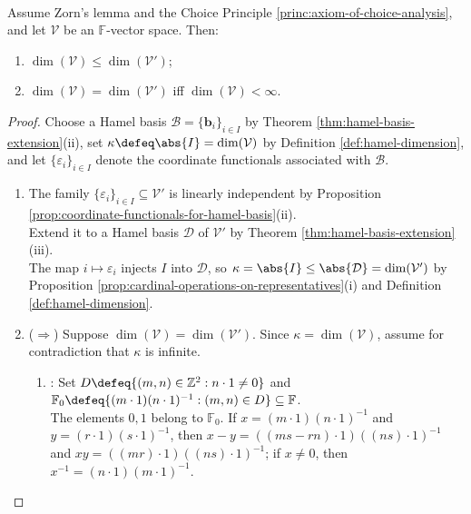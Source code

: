 \begin{theorem} \label{thm:dimension-of-algebraic-dual} \\
Assume Zorn's lemma and the Choice Principle \ref{princ:axiom-of-choice-analysis}, and let $\mathcal{V}$ be an $\mathbb{F}$-vector space. Then:
\begin{enumerate}[label=(\roman*)]
\setlength{\itemsep}{0pt}
\item $\dim(\mathcal{V})\leq\dim(\mathcal{V}')$;
\item $\dim(\mathcal{V})=\dim(\mathcal{V}')$ iff $\dim(\mathcal{V})<\infty$.
\end{enumerate}
\begin{proof}
Choose a Hamel basis $\mathcal{B}=\{\mathbf{b}_i\}_{i\in I}$ by Theorem \ref{thm:hamel-basis-extension}(ii), set $\kappa\defeq\abs{I}=\dim(\mathcal{V})$ by Definition \ref{def:hamel-dimension}, and let $\{\varepsilon_i\}_{i\in I}$ denote the coordinate functionals associated with $\mathcal{B}$.
\begin{enumerate}[label=(\roman*)]
\setlength{\itemsep}{0pt}
\item[$(i)$] The family $\{\varepsilon_i\}_{i\in I}\subseteq\mathcal{V}'$ is linearly independent by Proposition \ref{prop:coordinate-functionals-for-hamel-basis}(ii).\\
Extend it to a Hamel basis $\mathcal{D}$ of $\mathcal{V}'$ by Theorem \ref{thm:hamel-basis-extension}(iii).\\
The map $i\mapsto\varepsilon_i$ injects $I$ into $\mathcal{D}$, so $\kappa=\abs{I}\leq\abs{\mathcal{D}}=\dim(\mathcal{V}')$ by Proposition \ref{prop:cardinal-operations-on-representatives}(i) and Definition \ref{def:hamel-dimension}.
\item[$(ii)$] ($\Rightarrow$) Suppose $\dim(\mathcal{V})=\dim(\mathcal{V}')$. Since $\kappa=\dim(\mathcal{V})$, assume for contradiction that $\kappa$ is infinite.
\begin{enumerate}[label=(\alph*)]
\setlength{\itemsep}{0pt}
\item {}: Set $D\defeq\{(m,n)\in\mathbb{Z}^2:n\cdot1\neq0\}$ and $\mathbb{F}_0\defeq\{(m\cdot1)(n\cdot1)^{-1}:(m,n)\in D\}\subseteq\mathbb{F}$.\\
The elements $0,1$ belong to $\mathbb{F}_0$. If $x=(m\cdot1)(n\cdot1)^{-1}$ and $y=(r\cdot1)(s\cdot1)^{-1}$, then $x-y=((ms-rn)\cdot1)((ns)\cdot1)^{-1}$ and $xy=((mr)\cdot1)((ns)\cdot1)^{-1}$; if $x\neq0$, then $x^{-1}=(n\cdot1)(m\cdot1)^{-1}$.\\

\end{enumerate}
\end{enumerate}
\end{proof}
\end{theorem}
